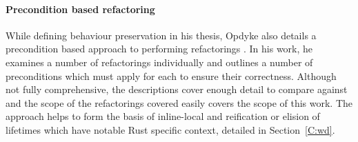 

\paragraph{Precondition based refactoring}
While defining behaviour preservation in his thesis, Opdyke also details a precondition based approach to performing refactorings \cite{opdyke1992refactoring}. In his work, he examines a number of refactorings individually and outlines a number of preconditions which must apply for each to ensure their correctness. Although not fully comprehensive, the descriptions cover enough detail to compare against and the scope of the refactorings covered easily covers the scope of this work. The approach helps to form the basis of inline-local and reification or elision of lifetimes which have notable Rust specific context, detailed in Section~\ref{C:wd}. 

